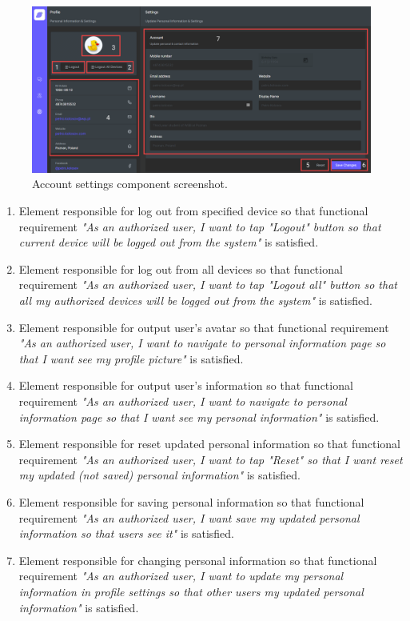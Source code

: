 \begin{figure}[H]
    \centering
    \includegraphics[width=1\textwidth]{Pictures/11_Messenger_account_settings}
    \caption{Account settings component screenshot.}\label{fig:figure11}
\end{figure}
\begin{enumerate}
    \item Element responsible for log out from specified device so that functional requirement
    \textit{"As an authorized user, I want to tap "Logout" button so that current device
    will be logged out from the system"} is satisfied.
    \item Element responsible for log out from all devices so that functional requirement
    \textit{"As an authorized user, I want to tap "Logout all" button so that all my authorized devices will be
    logged out from the system"} is satisfied.
    \item Element responsible for output user's avatar so that functional requirement
    \textit{"As an authorized user, I want to navigate to personal information page so that
    I want see my profile picture"} is satisfied.
    \item Element responsible for output user's information so that functional requirement
    \textit{"As an authorized user, I want to navigate to personal information page so that I want see my
    personal information"} is satisfied.
    \item Element responsible for reset updated personal information so that functional requirement
    \textit{"As an authorized user, I want to tap "Reset" so that I want reset my updated (not saved)
        personal information"} is satisfied.
    \item Element responsible for saving personal information so that functional requirement
    \textit{"As an authorized user, I want save my updated personal information so that users see it"}
    is satisfied.
    \item Element responsible for changing personal information so that functional requirement
    \textit{"As an authorized user, I want to update my personal information in profile settings so that other users
    my updated personal information"} is satisfied.
\end{enumerate}
